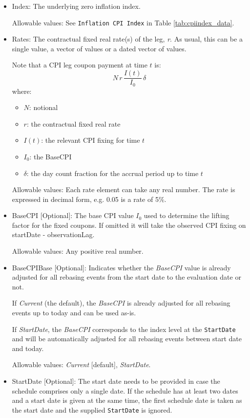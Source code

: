 \begin{itemize}
\item Index: The underlying zero inflation index.

Allowable values:  See \lstinline!Inflation CPI Index! in Table \ref{tab:cpiindex_data}.
\item Rates: The contractual fixed real rate(s) of the leg, \emph{r}. As usual, this can be a single value, a vector of values or a dated vector of
  values.

Note that a CPI leg coupon payment at time $t$ is:
$$
N\,r\,\frac{I(t)}{I_0}\,\delta
$$
where:
\begin{itemize}
\item $N$: notional
\item $r$: the contractual fixed real rate
\item $I(t)$: the relevant CPI fixing for time $t$
\item $I_0$: the BaseCPI
\item $\delta$: the day count fraction for the accrual period up to
time $t$
\end{itemize}

 Allowable values: Each rate element can take any  real number. The rate is
  expressed in decimal form, e.g. 0.05 is a rate of 5\%.

\item BaseCPI [Optional]: The base CPI value $I_0$ used to determine the lifting factor for the fixed coupons. If omitted it will take the observed CPI fixing on startDate - observationLag.

Allowable values:  Any positive real number.

\item BaseCPIBase [Optional]: Indicates whether the \emph{BaseCPI} value is already adjusted for all rebasing events from the start date to the evaluation date or not.

If \emph{Current} (the default), the \emph{BaseCPI} is already adjusted for all rebasing events up to today and can be used as-is.

If \emph{StartDate}, the \emph{BaseCPI} corresponds to the index level at the \lstinline!StartDate! and will be automatically adjusted for all rebasing events between start date and today.

Allowable values:  \emph{Current} [default], \emph{StartDate}. 

\item StartDate [Optional]: The start date needs to be provided in case the schedule comprises only a single date. If
  the schedule has at least two dates and a start date is given at the same time, the first schedule date is taken as
  the start date and the supplied \lstinline!StartDate! is ignored.


\end{itemize}

